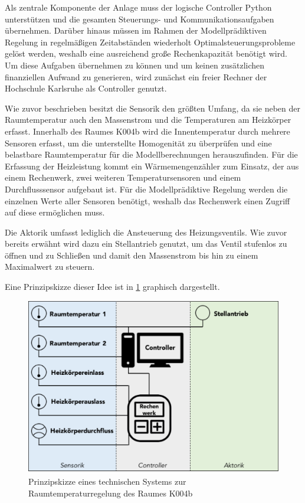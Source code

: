 Als zentrale Komponente der Anlage muss der logische Controller Python unterstützen und die gesamten Steuerungs- und Kommunikationsaufgaben übernehmen. Darüber hinaus müssen im Rahmen der Modellprädiktiven Regelung in regelmäßigen Zeitabständen wiederholt Optimalsteuerungsprobleme gelöst werden, weshalb eine ausreichend große Rechenkapazität benötigt wird. Um diese Aufgaben übernehmen zu können und um keinen zusätzlichen finanziellen Aufwand zu generieren, wird zunächst ein freier Rechner der Hochschule Karlsruhe als Controller genutzt.  

Wie zuvor beschrieben besitzt die Sensorik den größten Umfang, da sie neben der Raumtemperatur auch den Massenstrom und die Temperaturen am Heizkörper erfasst. Innerhalb des Raumes K004b wird die Innentemperatur durch mehrere Sensoren erfasst, um die unterstellte Homogenität zu überprüfen und eine belastbare Raumtemperatur für die Modellberechnungen herauszufinden. Für die Erfassung der Heizleistung kommt ein Wärmemengenzähler zum Einsatz, der aus einem Rechenwerk, zwei weiteren Temperatursensoren und einem Durchflusssensor aufgebaut ist. Für die Modellprädiktive Regelung werden die einzelnen Werte aller Sensoren benötigt, weshalb das Rechenwerk einen Zugriff auf diese ermöglichen muss.

Die Aktorik umfasst lediglich die Ansteuerung des Heizungsventils. Wie zuvor bereits erwähnt wird dazu ein Stellantrieb genutzt, um das Ventil stufenlos zu öffnen und zu Schließen und damit den Massenstrom bis hin zu einem Maximalwert zu steuern. 

Eine Prinzipskizze dieser Idee ist in \ref{fig:konzept} graphisch dargestellt.

\begin{figure}
\centering
\includegraphics[width=\textwidth]{abbildungen/20160318_Konzept}
\caption{Prinzipskizze eines technischen Systems zur Raumtemperaturregelung des Raumes K004b}
\label{fig:konzept}
\end{figure}

